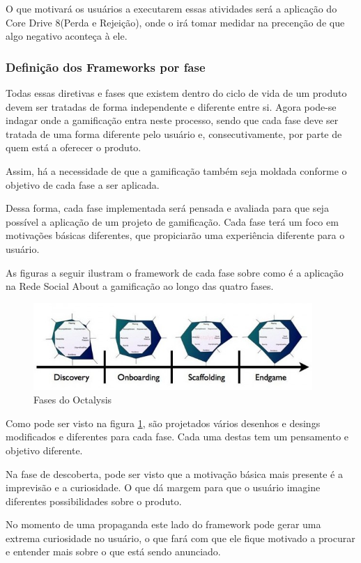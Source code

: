 O que motivará os usuários a executarem essas atividades será a aplicação 
do Core Drive 8(Perda e Rejeição), onde o irá tomar medidar na precenção de
que algo negativo aconteça à ele.


\subsubsection{Definição dos Frameworks por fase}
\label{sub:fim_de_jogo}
Todas essas diretivas e fases que existem dentro do ciclo de vida de um produto devem ser
tratadas de forma independente e diferente entre si. Agora pode-se indagar onde a gamificação
entra neste processo, sendo que cada fase deve ser tratada de uma forma diferente pelo
usuário e, consecutivamente, por parte de quem está a oferecer o produto.

Assim, há a necessidade de que a gamificação também seja moldada conforme o objetivo de
cada fase a ser aplicada.

Dessa forma, cada fase implementada será pensada e avaliada para que seja possível a
aplicação de um  projeto de gamificação. Cada fase terá um foco em motivações
básicas diferentes, que propiciarão uma experiência diferente para o usuário.

As figuras a seguir ilustram o framework de cada fase sobre como é a aplicação na
Rede Social About a gamificação ao longo das quatro fases.

\begin{figure}[h]
    \centering
    \includegraphics[width=400px, scale=1]{figuras/fasesoctalysis}
    \caption{Fases do Octalysis}
    \label{fig:fasesoctalysis}
\end{figure}

Como pode ser visto na figura \ref{fig:fasesoctalysis}, são projetados vários
desenhos e desings modificados e diferentes para cada fase. Cada uma destas
tem um pensamento e objetivo diferente.

Na fase de descoberta, pode ser visto que a motivação básica mais presente é
a imprevisão e a curiosidade. O que dá margem para que o usuário imagine diferentes
possibilidades sobre o produto. 

No momento de uma propaganda este lado do framework pode gerar uma
extrema curiosidade no usuário, o que fará com que ele fique motivado a procurar
e entender mais sobre o que está sendo anunciado.

